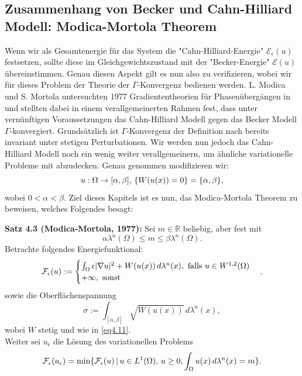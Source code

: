 \subsection{Zusammenhang von Becker und Cahn-Hilliard Modell: Modica-Mortola Theorem}{\label{subsec:modicamortola}}
Wenn wir als Gesamtenergie für das System die "Cahn-Hilliard-Energie" \(\mathcal{E}_{\epsilon}(u)\) festsetzen, sollte diese im Gleichgewichtszustand mit der "Becker-Energie" \(\mathcal{E}(u)\) übereinstimmen. Genau diesen Aspekt gilt es nun also zu verifizieren, wobei wir für dieses Problem der Theorie der \(\Gamma\)-Konvergenz bedienen werden. L. Modica und S. Mortola untersuchten 1977 Gradiententheorien für Phasenübergängen in \cite{mortola1977esempio} und stellten dabei in einem verallgemeinerten Rahmen fest, dass unter vernünftigen Voraussetzungen das Cahn-Hilliard Modell gegen das Becker Modell \(\Gamma\)-konvergiert. Grundsätzlich ist \(\Gamma\)-Konvergenz der Definition nach bereits invariant unter stetigen Perturbationen. Wir werden nun jedoch das Cahn-Hilliard Modell noch ein wenig weiter verallgemeinern, um ähnliche variationelle Probleme mit abzudecken. Genau genommen modifizieren wir:
\begin{equation}{\label{eq4.11}}
    u : \Omega \to [\alpha,\beta], \, \{W(u(x)) = 0\} = \{\alpha,\beta\},
\end{equation}
wobei \(0 < \alpha < \beta\). Ziel dieses Kapitels ist es nun, das Modica-Mortola Theorem zu beweisen, welches Folgendes besagt:\\[0.5cm]
\colorbox{generalYellow}{\begin{minipage}{16cm}{\textcolor{black}{}{\label{theo4.3}}}
\textbf{Satz 4.3 (Modica-Mortola, 1977):} Sei \(m \in \mathbb{R}\) beliebig, aber fest mit
\begin{equation}
    \alpha \lambda^n(\Omega) \leq m \leq \beta \lambda^n(\Omega).
\end{equation}
Betrachte folgendes Energiefunktional:
\begin{equation}
    \mathcal{F}_{\epsilon}(u) :=
    \begin{cases}
        \int_{\Omega} \epsilon |\nabla u|^2 + W(u(x)) \, d\lambda^n(x), \text{ falls }u \in W^{1,2}(\Omega) \\ +\infty, \text{ sonst}
    \end{cases},
\end{equation}
sowie die Oberflächenspannung
\begin{equation}
    \sigma := \int_{[\alpha,\beta]} \sqrt{W(u(x))}\, d\lambda^n(x),
\end{equation}
wobei \(W\) stetig und wie in \eqref{eq4.11}.\\
Weiter sei \(u_{\epsilon}\) die Lösung des variationellen Problems
\begin{equation}
    \mathcal{F}_{\epsilon}(u_{\epsilon}) = \min \{\mathcal{F}_{\epsilon}(u) \, | \, u \in L^1(\Omega), \, u \geq 0, \int_{\Omega} u(x) \, d\lambda^n(x)= m\}.
\end{equation}
\end{minipage}}

